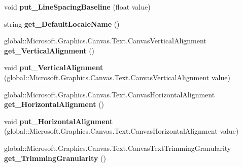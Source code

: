 \begin{DoxyCompactItemize}
void {\bfseries put\+\_\+\+Line\+Spacing\+Baseline} (float value)
\item 
\mbox{\label{interface_microsoft_1_1_graphics_1_1_canvas_1_1_text_1_1_i_canvas_text_layout_af248dfd0ffc3343fe06b678a4187ee4f}} 
string {\bfseries get\+\_\+\+Default\+Locale\+Name} ()
\item 
\mbox{\label{interface_microsoft_1_1_graphics_1_1_canvas_1_1_text_1_1_i_canvas_text_layout_ab4a563e714253a63ce04baf03dcc74d1}} 
global\+::\+Microsoft.\+Graphics.\+Canvas.\+Text.\+Canvas\+Vertical\+Alignment {\bfseries get\+\_\+\+Vertical\+Alignment} ()
\item 
\mbox{\label{interface_microsoft_1_1_graphics_1_1_canvas_1_1_text_1_1_i_canvas_text_layout_a739a2321aadcdbc5778eb75fff7a82d6}} 
void {\bfseries put\+\_\+\+Vertical\+Alignment} (global\+::\+Microsoft.\+Graphics.\+Canvas.\+Text.\+Canvas\+Vertical\+Alignment value)
\item 
\mbox{\label{interface_microsoft_1_1_graphics_1_1_canvas_1_1_text_1_1_i_canvas_text_layout_a0eca2347bb72344130499308b22b5c75}} 
global\+::\+Microsoft.\+Graphics.\+Canvas.\+Text.\+Canvas\+Horizontal\+Alignment {\bfseries get\+\_\+\+Horizontal\+Alignment} ()
\item 
\mbox{\label{interface_microsoft_1_1_graphics_1_1_canvas_1_1_text_1_1_i_canvas_text_layout_a1ed48a95cc077705f220f440b7d0ec96}} 
void {\bfseries put\+\_\+\+Horizontal\+Alignment} (global\+::\+Microsoft.\+Graphics.\+Canvas.\+Text.\+Canvas\+Horizontal\+Alignment value)
\item 
\mbox{\label{interface_microsoft_1_1_graphics_1_1_canvas_1_1_text_1_1_i_canvas_text_layout_a0e97f065a5957e5937f383d4e8676d1f}} 
global\+::\+Microsoft.\+Graphics.\+Canvas.\+Text.\+Canvas\+Text\+Trimming\+Granularity {\bfseries get\+\_\+\+Trimming\+Granularity} ()
\item 

\end{DoxyCompactItemize}
